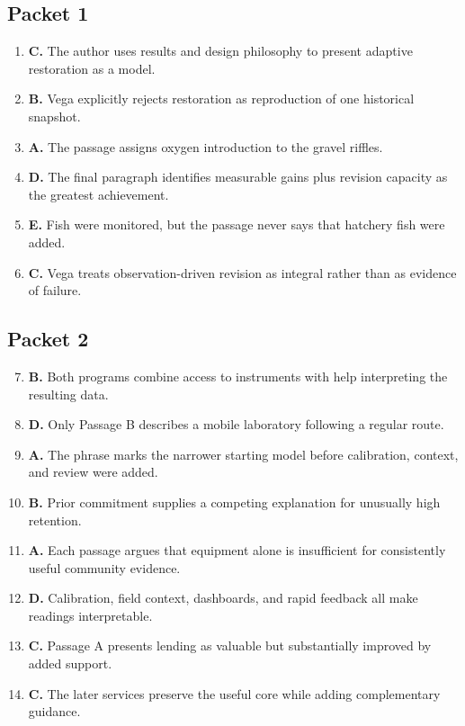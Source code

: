 \subsection*{Packet 1}
\begin{enumerate}
\item \textbf{C.} The author uses results and design philosophy to present adaptive restoration as a model.
\item \textbf{B.} Vega explicitly rejects restoration as reproduction of one historical snapshot.
\item \textbf{A.} The passage assigns oxygen introduction to the gravel riffles.
\item \textbf{D.} The final paragraph identifies measurable gains plus revision capacity as the greatest achievement.
\item \textbf{E.} Fish were monitored, but the passage never says that hatchery fish were added.
\item \textbf{C.} Vega treats observation-driven revision as integral rather than as evidence of failure.
\end{enumerate}

\subsection*{Packet 2}
\begin{enumerate}\setcounter{enumi}{6}
\item \textbf{B.} Both programs combine access to instruments with help interpreting the resulting data.
\item \textbf{D.} Only Passage B describes a mobile laboratory following a regular route.
\item \textbf{A.} The phrase marks the narrower starting model before calibration, context, and review were added.
\item \textbf{B.} Prior commitment supplies a competing explanation for unusually high retention.
\item \textbf{A.} Each passage argues that equipment alone is insufficient for consistently useful community evidence.
\item \textbf{D.} Calibration, field context, dashboards, and rapid feedback all make readings interpretable.
\item \textbf{C.} Passage A presents lending as valuable but substantially improved by added support.
\item \textbf{C.} The later services preserve the useful core while adding complementary guidance.
\end{enumerate}

